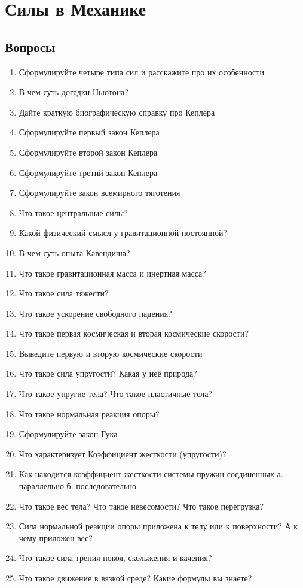 \documentclass[12pt,a4paper]{report}
\begin{document}
\chapter{Силы в Механике}
\section{Вопросы}
\begin{enumerate}
\item Сформулируйте четыре типа сил и расскажите про их особенности
\item В чем суть догадки Ньютона?
\item Дайте краткую биографическую справку про Кеплера
\item Сформулируйте первый закон Кеплера
\item Сформулируйте второй закон Кеплера
\item Сформулируйте третий закон Кеплера
\item Сформулируйте закон всемирного тяготения
\item Что такое центральные силы?
\item Какой физический смысл у гравитационной постоянной?
\item В чем суть опыта Кавендиша?
\item Что такое гравитационная масса и инертная масса?
\item Что такое сила тяжести?
\item Что такое ускорение свободного падения?
\item Что такое первая космическая и вторая космические скорости?
\item Выведите первую и вторую космические скорости
\item Что такое сила упругости? Какая у неё природа?
\item Что такое упругие тела? Что такое пластичные тела? 
\item Что такое нормальная реакция опоры?
\item Сформулируйте закон Гука
\item Что характеризует Коэффициент жесткости (упругости)?
\item Как находится коэффициент жесткости системы пружин соединенных а. параллельно б. последовательно
\item Что такое вес тела? Что такое невесомости? Что такое перегрузка?
\item Сила нормальной реакции опоры приложена к телу или к поверхности? А к чему приложен вес?
\item Что такое сила трения покоя, скольжения и качения?
\item Что такое движение в вязкой среде? Какие формулы вы знаете?
\end{enumerate}
\end{document}

